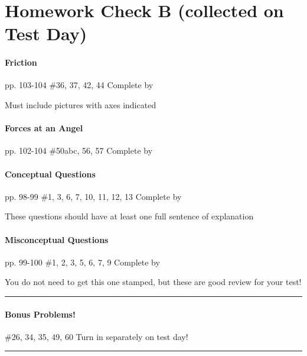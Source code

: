 \documentclass[10pt]{exam}
\begin{document}
\section*{Homework Check B (collected on Test Day)}

\paragraph{Friction} pp. 103-104 \#36, 37, 42, 44
\dotfill Complete by \fillin[][7em]
   
{\sc Must include pictures with axes indicated}




\paragraph{Forces at an Angel} pp. 102-104 \#50abc, 56, 57
\dotfill Complete by \fillin[][7em]
   


\paragraph{Conceptual Questions} pp. 98-99 \#1, 3, 6, 7, 10, 11, 12, 13
\dotfill Complete by \fillin[][7em]
   
{\sc These questions should have at least one full sentence 
      of explanation}



\paragraph{Misconceptual Questions} pp. 99-100 \#1, 2, 3, 5, 6, 7, 9
\dotfill Complete by \fillin[][7em]
   
{\sc You do not need to get this one stamped,
but these are good review for your test!}

\vspace{1em}
\hrule


\paragraph{Bonus Problems!} \#26, 34, 35, 49, 60
\dotfill Turn in separately on test day!

\vspace{1em}
\hrule
\end{document}

